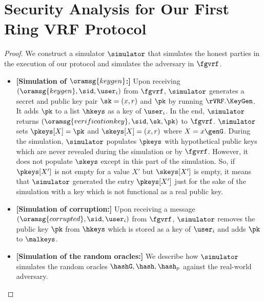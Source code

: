 
\section{Security Analysis for Our First Ring VRF Protocol}

\begin{proof}
	We construct a simulator $ \simulator $ that simulates the honest parties in the execution of our protocol and simulates the adversary in $ \fgvrf $. 
	\begin{itemize}
		
		\item \textbf{[Simulation of $ \oramsg{keygen} $:]} Upon receiving $(\oramsg{keygen}, \sid, \user_i)$ from $\fgvrf$, $ \simulator $ generates  a secret and public key pair $ \sk = (x,r)$ and $\pk $ by running $ \rVRF.\KeyGen $. It adds $ \pk $ to a list $ \hkeys $  as a key of $ \user_i $.
		In the end, $ \simulator $ returns $(\oramsg{verificationkey}, \sid, \sk,\pk)$ to $\fgvrf$. 
		$ \simulator $ sets $ \pkeys[X] = \pk$ and $ \skeys[X] =(x,r) $ where $ X = x \genG $.
		During the simulation, $ \simulator $ populates $ \pkeys $ with hypothetical public keys which are never revealed during the simulation or by $ \fgvrf $. However, it does not populate $ \skeys $ except in this part of the simulation. So, if  $ \pkeys[X'] $ is not empty for a value $ X' $ but $ \skeys[X'] $ is empty, it means that $ \simulator $ generated the entry $ \pkeys[X'] $ just for the sake of the simulation with a key which is not  functional as a real public key.
		
		\item \textbf{[Simulation of corruption:]} Upon receiving a message $ (\oramsg{corrupted}, \sid, \user_i) $ from $ \fgvrf $, $ \simulator $ removes the public key $ \pk $ from $ \hkeys $ which is stored as a key of $ \user_i $ and adds $ \pk $ to $ \malkeys $.
		
		\item\textbf{[Simulation of the random oracles:]} We  describe how $ \simulator $ simulates the random oracles $ \hashG, \hash, \hash_p $ against the real-world adversary.
		

\end{itemize}
\end{proof}
